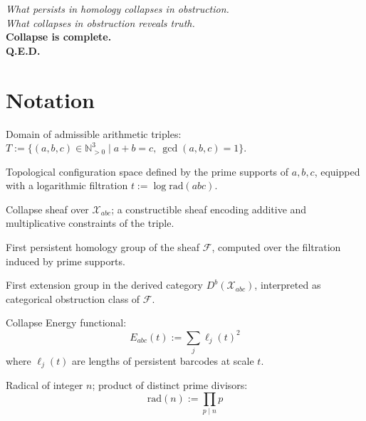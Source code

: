 \documentclass[11pt]{article}
\begin{document}
\begin{center}
\textit{What persists in homology collapses in obstruction.} \\
\textit{What collapses in obstruction reveals truth.} \\
\textbf{Collapse is complete.} \\
\textbf{Q.E.D.}
\end{center}



\section*{Notation}

\begin{description}[leftmargin=3.2cm, labelsep=0.8cm]

\item[$T$] 
Domain of admissible arithmetic triples:  
\( T := \{ (a,b,c) \in \mathbb{N}_{>0}^3 \mid a + b = c,\ \gcd(a,b,c) = 1 \} \).

\item[$\mathcal{X}_{abc}$] 
Topological configuration space defined by the prime supports of \( a,b,c \),  
equipped with a logarithmic filtration \( t := \log \mathrm{rad}(abc) \).

\item[$\mathcal{F}_{abc}$] 
Collapse sheaf over \( \mathcal{X}_{abc} \);  
a constructible sheaf encoding additive and multiplicative constraints of the triple.

\item[$\mathrm{PH}_1(\mathcal{F})$] 
First persistent homology group of the sheaf \( \mathcal{F} \),  
computed over the filtration induced by prime supports.

\item[$\mathrm{Ext}^1(\mathcal{F}, \mathbb{Q}_\ell)$] 
First extension group in the derived category \( D^b(\mathcal{X}_{abc}) \),  
interpreted as categorical obstruction class of \( \mathcal{F} \).

\item[$E_{abc}(t)$] 
Collapse Energy functional:
\[
E_{abc}(t) := \sum_j \ell_j(t)^2
\]
where \( \ell_j(t) \) are lengths of persistent barcodes at scale \( t \).

\item[$\mathrm{rad}(n)$] 
Radical of integer \( n \); product of distinct prime divisors:
\[
\mathrm{rad}(n) := \prod_{p \mid n} p
\]


\end{description}
\end{document}
